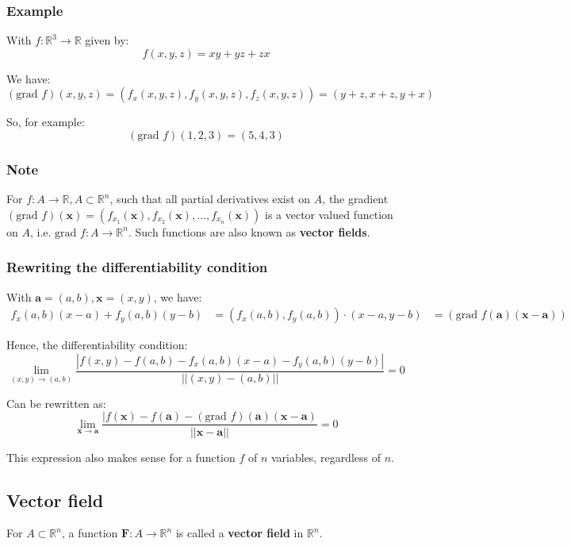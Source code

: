 \documentclass[11pt]{article}
\begin{document}
\subsubsection{Example}
\label{sec:org69ff591}
With \(f : \mathbb{R}^3 \rightarrow \mathbb{R}\) given by:
\[f(x, y, z) = xy + yz + zx\]

We have:
\[(\text{grad } f)(x, y, z) =(f_x(x, y, z), f_y(x, y, z), f_z(x, y, z)) = (y + z, x + z, y + x)\]

So, for example:
\[(\text{grad } f)(1, 2, 3) = (5, 4, 3)\]
\subsubsection{Note}
\label{sec:org0f36c14}
For \(f : A \rightarrow \mathbb{R}, A \subset \mathbb{R}^n\), such that all partial derivatives exist on \(A\), the gradient \((\text{grad } f)(\boldsymbol{x}) = (f_{x_1}(\boldsymbol{x}),f_{x_2}(\boldsymbol{x}), \ldots, f_{x_n}(\boldsymbol{x}))\) is a vector valued function on \(A\), i.e. \(\text{grad } f : A \rightarrow \mathbb{R}^n\). Such functions are also known as \textbf{vector fields}.
\subsubsection{Rewriting the differentiability condition}
\label{sec:org0692ae6}
With \(\boldsymbol{a} = (a, b), \boldsymbol{x} = (x, y)\), we have:
\begin{align*}
f_x(a, b)(x - a) + f_y (a, b) (y - b) &= (f_x(a, b), f_y(a, b)) \cdot (x - a, y - b)
&= (\text{grad } f (\boldsymbol{a}) (\boldsymbol{x} - \boldsymbol{a}))
\end{align*}

Hence, the differentiability condition:
\[\lim_{(x, y) \rightarrow (a, b)} \frac{|f(x, y) - f(a, b) - f_x(a, b) (x - a) - f_y (a, b) (y - b)|}{||(x, y) -(a, b)||} = 0\]

Can be rewritten as:
\[\lim_{\boldsymbol{x} \rightarrow \boldsymbol{a}} \frac{|f(\boldsymbol{x}) - f(\boldsymbol{a}) - (\text{grad } f)(\boldsymbol{a}) (\boldsymbol{x} - \boldsymbol{a})}{||\boldsymbol{x} - \boldsymbol{a}||} = 0\]

This expression also makes sense for a function \(f\) of \(n\) variables, regardless of \(n\).
\subsection{Vector field}
\label{sec:orgda1a329}
For \(A \subset \mathbb{R}^n\), a function \(\boldsymbol{F} : A \rightarrow \mathbb{R}^n\) is called a \textbf{vector field} in \(\mathbb{R}^n\).
\end{document}
